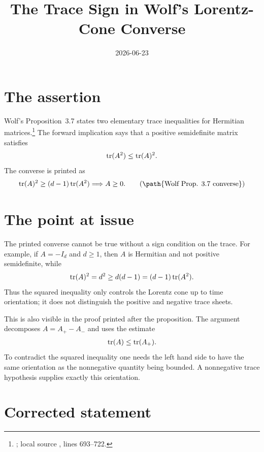 \documentclass{article}
\title{The Trace Sign in Wolf's Lorentz-Cone Converse}
\author{}
\date{2026-06-23}
\begin{document}
\maketitle
{}

\section{The assertion}

Wolf's Proposition~3.7 states two elementary trace inequalities for Hermitian
matrices.\footnote{\cite[Proposition~3.7]{Wolf2012Quantum};
local source ,
lines 693--722.}  The forward implication says that a positive semidefinite
matrix satisfies
\begin{align}
  \operatorname{tr}(A^2) \le \operatorname{tr}(A)^2.
\end{align}
The converse is printed as
\begin{align}
  \tr(A)^2 \ge (d-1)\tr(A^2) \Longrightarrow A \ge 0.
  \tag{\path{Wolf Prop. 3.7 converse}}
\end{align}

\section{The point at issue}

The printed converse cannot be true without a sign condition on the trace.  For
example, if \(A=-I_d\) and \(d\geq 1\), then \(A\) is Hermitian and not positive
semidefinite, while
\begin{align}
  \operatorname{tr}(A)^2=d^2 \ge d(d-1)=(d-1)\operatorname{tr}(A^2).
\end{align}
Thus the squared inequality only controls the Lorentz cone up to time
orientation; it does not distinguish the positive and negative trace sheets.

This is also visible in the proof printed after the proposition.  The argument
decomposes \(A=A_+-A_-\) and uses the estimate
\begin{align}
  \operatorname{tr}(A) \le \operatorname{tr}(A_+).
\end{align}
To contradict the squared inequality one needs the left hand side to have the
same orientation as the nonnegative quantity being bounded.  A nonnegative
trace hypothesis supplies exactly this orientation.

\section{Corrected statement}
\end{document}
